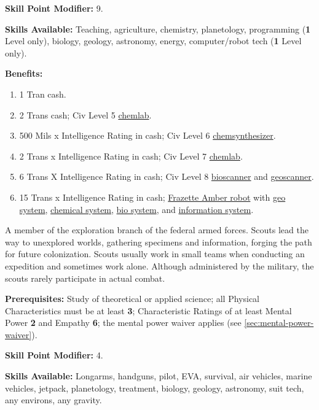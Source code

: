 \textbf{Skill Point Modifier:} 9.  

\textbf{Skills Available:} Teaching, agriculture, chemistry,
planetology, programming (\textbf{1} Level only), biology, geology, astronomy,
energy, computer/robot tech (\textbf{1} Level only).

\pagebreak[2]
\textbf{Benefits:}
\begin{enumerate}
\item 1 Tran cash.  
\item 2 Trans cash; Civ Level 5 \hyperlink{tag:chemlab}{chemlab}.
\item 500 Mils x Intelligence Rating in cash; Civ Level 6
  \hyperlink{tag:chemsynth}{chemsynthesizer}.
\item 2 Trans x Intelligence Rating in cash; Civ Level 7 \hyperlink{tag:chemlab}{chemlab}.
\item 6 Trans X Intelligence Rating in cash; Civ Level 8 \hyperlink{tag:bioscanner}{bioscanner}
  and \hyperlink{tag:geoscanner}{geoscanner}.
\item 15 Trans x Intelligence Rating in cash; \hyperlink{tag:bot-frazette-amber}{Frazette Amber robot}
  with \hyperlink{tag:bot-geo}{geo system}, \hyperlink{tag:bot-chemical}{chemical system}, \hyperlink{tag:bot-bio}{bio system}, and \hyperlink{tag:bot-information}{information
  system}.
\end{enumerate}

\bigskip

\pagebreak[2]

\label{sec:prof-scout}

A member of the exploration branch of the federal armed forces. Scouts
lead the way to unexplored worlds, gathering specimens and
information, forging the path for future colonization. Scouts usually
work in small teams when conducting an expedition and sometimes work
alone. Although administered by the military, the scouts rarely
participate in actual combat.

\textbf{Prerequisites:} Study of theoretical or applied science; all
  Physical Characteristics  must be at least  \textbf{3}; Characteristic
  Ratings of at least Mental Power  \textbf{2} and Empathy  \textbf{6}; the mental power
  waiver applies  (see \ref{sec:mental-power-waiver}).

\textbf{Skill Point Modifier:} 4.

\textbf{Skills Available:}  Longarms, handguns, pilot, EVA, survival,
   air vehicles, marine vehicles, jetpack, planetology, treatment,
   biology, geology, astronomy, suit tech, any environs, any gravity.

